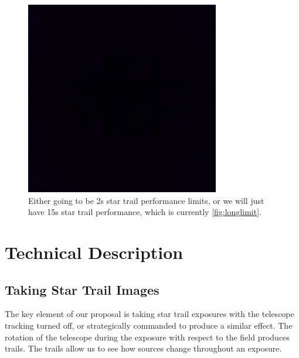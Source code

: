 \documentclass[12pt, letterpaper]{article}
\begin{document}
\begin{figure}[htb!]
\center
\includegraphics[scale=0.5]{bbox.jpeg}
\caption{Either going to be 2s star trail performance limits, or we will just have 15s star trail performance, which is currently \ref{fig:longlimit}.}
\label{fig:shortlimit}
\end{figure}

\vspace{.6in}
\newpage
\section{Technical Description}
\label{sec:technical}

\subsection{Taking Star Trail Images}
\label{sec:overview}

The key element of our proposal is taking star trail exposures with the telescope tracking turned off, or strategically commanded to produce a similar effect. The rotation of the telescope during the exposure with respect to the field produces trails. The trails allow us to see how sources change throughout an exposure. 
\end{document}
